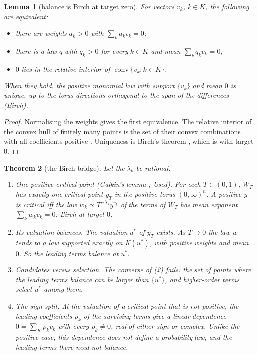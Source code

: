 \documentclass[11pt]{article}
\newtheorem{theorem}{Theorem}\newtheorem{proposition}[theorem]{Proposition}\newtheorem{lemma}[theorem]{Lemma}\newtheorem{corollary}[theorem]{Corollary}\newtheorem{conjecture}[theorem]{Conjecture}\crefname{conjecture}{Conjecture}{Conjectures}
\theoremstyle{definition}\newtheorem{definition}[theorem]{Definition}\newtheorem{remark}[theorem]{Remark}\newtheorem{example}[theorem]{Example}\newtheorem{problem}[theorem]{Open problem}\crefname{problem}{Problem}{Problems}
\begin{document}
\begin{lemma}[balance is Birch at target zero]\label{lem:balance}
For vectors $v_k$, $k\in K$, the following are equivalent:
\begin{itemize}
\item there are weights $a_k>0$ with $\sum_ka_kv_k=0$;
\item there is a law $q$ with $q_k>0$ for every $k\in K$ and mean $\sum_kq_kv_k=0$;
\item $0$ lies in the relative interior of $\operatorname{conv}\{v_k:k\in K\}$.
\end{itemize}
When they hold, the positive monomial law with support $\{v_k\}$ and mean $0$ is unique, up to the torus directions orthogonal to the span of the
differences (Birch).
\end{lemma}

\begin{proof}
Normalising the weights gives the first equivalence. The relative interior of the convex hull of finitely many points is the set of their
convex combinations with all coefficients positive \cite[Theorem~6.9]{Rockafellar1970}. Uniqueness is Birch's theorem \cite{Birch1963}, which is
\cite[Theorem ``the toric realization''(1)]{Layers} with target $0$.
\end{proof}

\begin{theorem}[the Birch bridge]\label{thm:bridge}
Let the $\lambda_k$ be rational.
\begin{enumerate}
\item[(1)] \emph{One positive critical point} (Galkin's lemma \cite{Galkin2014}; Used). For each $T\in(0,1)$, $W_T$ has exactly one critical point $y_T$ in the positive torus $(0,\infty)^n$. A positive $y$ is
  critical iff the law $w_k\propto T^{-\lambda_k}y^{v_k}$ of the terms of $W_T$ has mean exponent $\sum_kw_kv_k=0$: Birch at target $0$.
\item[(2)] \emph{Its valuation balances.} The valuation $u^*$ of $y_T$ exists. As $T\to0$ the law $w$ tends to a law supported exactly on $K(u^*)$, with positive weights and
  mean $0$. So the leading terms balance at $u^*$.
\item[(3)] \emph{Candidates versus selection.} The converse of (2) fails: the set of points where the leading terms balance can be larger than
  $\{u^*\}$, and higher-order terms select $u^*$ among them.
\item[(4)] \emph{The sign split.} At the valuation of a critical point that is not positive, the leading coefficients $\rho_k$ of the surviving terms give
  a linear dependence $0=\sum_{K}\rho_kv_k$ with every $\rho_k\ne0$, real of either sign or complex. Unlike the positive case, this dependence
  does not define a probability law, and the leading terms there need not balance.
\end{enumerate}
\end{theorem}
\end{document}
